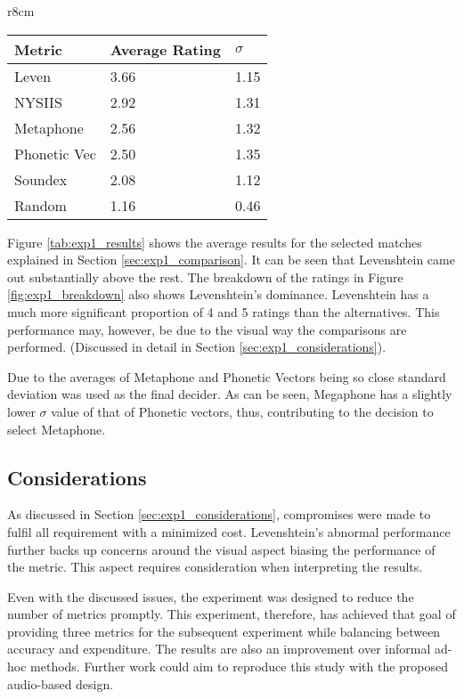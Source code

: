 \begin{wraptable}[11]{r}{8cm}
    \centering
    \begin{tabular}{|l|l|l|}
        \hline
        \textbf{Metric} & \textbf{Average Rating}  & \textbf{$\sigma$}\\
        \hline
        Leven     & 3.66  & 1.15\\
        NYSIIS    & 2.92 & 1.31\\
        Metaphone & 2.56 & 1.32\\
        Phonetic Vec & 2.50 & 1.35\\
        Soundex & 2.08 & 1.12 \\
        \hline
        Random  & 1.16 & 0.46\\
        \hline
    \end{tabular}
    \caption{Average metric performance}
    \label{tab:exp1_results}
\end{wraptable}


Figure \ref{tab:exp1_results} shows the average results for the selected matches explained in Section \ref{sec:exp1_comparison}. It can be seen that Levenshtein came out substantially above the rest. The breakdown of the ratings in Figure \ref{fig:exp1_breakdown} also shows Levenshtein's dominance. Levenshtein has a much more significant proportion of 4 and 5 ratings than the alternatives. This performance may, however, be due to the visual way the comparisons are performed. (Discussed in detail in Section \ref{sec:exp1_considerations}). 

Due to the averages of Metaphone and Phonetic Vectors being so close standard deviation was used as the final decider. As can be seen, Megaphone has a slightly lower $\sigma$ value of that of Phonetic vectors, thus, contributing to the decision to select Metaphone.

\subsection*{Considerations}
As discussed in Section \ref{sec:exp1_considerations}, compromises were made to fulfil all requirement with a minimized cost. Levenshtein's abnormal performance further backs up concerns around the visual aspect biasing the performance of the metric. This aspect requires consideration when interpreting the results. 

Even with the discussed issues, the experiment was designed to reduce the number of metrics promptly. This experiment, therefore, has achieved that goal of providing three metrics for the subsequent experiment while balancing between accuracy and expenditure. The results are also an improvement over informal ad-hoc methods. Further work could aim to reproduce this study with the proposed audio-based design.

